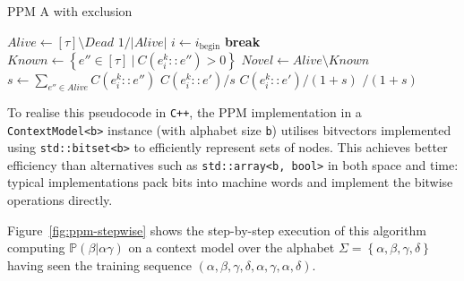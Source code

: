 \documentclass[12pt,a4paper,twoside,openright]{report}
\newcommand{\set}[1]{ \left\{ #1 \right\} }
\begin{document}
\begin{algorithm}[H]
  \caption{PPM A with exclusion}
  \label{alg:ppm-a}
  \begin{algorithmic}[1]
      \State $\textit{Alive} \gets [\tau] \setminus \textit{Dead}$
      \State \Return $1 / |\textit{Alive}|$ 
      \EndIf
      \State $i \gets i_{\mathrm{begin}}$
       \textbf{break}
        \EndIf       
      \EndFor 
      \State $\textit{Known} \gets \set{ e'' \in [\tau]\ |\ C(e_i^k :: e'') > 0 }$
      \State $\textit{Novel} \gets Alive \setminus Known$ 
      \State $s \gets \sum_{e'' \in \textit{Alive}} C(e_i^k :: e'')$ 
        \State \Return $C(e_i^k :: e') / s$ 
      \EndIf
      \State \Return $C(e_i^k::e') / (1 + s)$ 
      \EndIf
      \State \Return {}$ / (1
      + s)$ 
    \EndFunction
  \end{algorithmic}
\end{algorithm}

To realise this pseudocode in \texttt{C++}, the PPM implementation in a
\texttt{ContextModel<b>} instance (with alphabet size \texttt{b}) utilises
bitvectors implemented using \texttt{std::bitset<b>} to efficiently represent
sets of nodes. This achieves better efficiency than alternatives such as
\texttt{std::array<b, bool>} in both space and time: typical implementations
pack bits into machine words and implement the bitwise operations directly.

Figure~\ref{fig:ppm-stepwise} shows the step-by-step execution of this algorithm
computing $\mathbb{P}(\beta|\alpha\gamma)$ on a context model over the alphabet $\Sigma =
\set{\alpha,\beta,\gamma,\delta}$ having seen the training sequence
$(\alpha,\beta,\gamma,\delta,\alpha,\gamma,\alpha,\delta)$.
\end{document}
